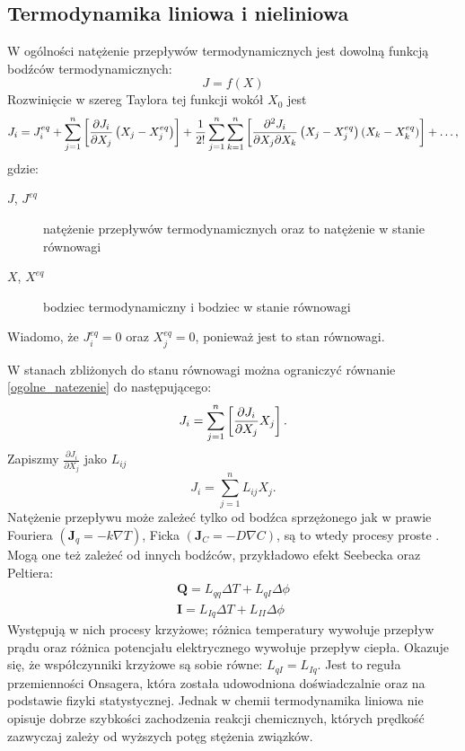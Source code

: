 \documentclass[10pt, a4paper, twoside, onecolumn]{article}
\numberwithin{equation}{section}
\begin{document}
	\subsection{Termodynamika liniowa i nieliniowa}
	W ogólności natężenie przepływów termodynamicznych jest dowolną funkcją bodźców termodynamicznych: 
	\[J=f\left(X\right)\]
	Rozwinięcie w szereg Taylora tej funkcji wokół \(X_{0}\) jest
	\begin{equation}\label{ogolne_natezenie}
		J_{i}=J_{i}^{eq}+\sum_{j=1}^{n}\left[\pdv{J_{i}}{X_{j}}\left(X_{j}-X_{j}^{eq}\right)\right]+\frac{1}{2!}\sum_{j=1}^{n}\sum_{k=1}^{n}\left[\pdv{J_{i}}{X_{j}}{X_{k}}\left(X_{j}-X_{j}^{eq}\right)\left(X_{k}-X_{k}^{eq}\right)\right]+\ldots,
	\end{equation}
	gdzie:
	\begin{description}
		\item[\(J\), \(J^{eq}\)] natężenie przepływów termodynamicznych oraz to natężenie w stanie równowagi
		\item[\(X\), \(X^{eq}\)] bodziec termodynamiczny i bodziec w stanie równowagi
	\end{description}
	Wiadomo, że \(J_{i}^{eq}=0\) oraz \(X_{j}^{eq}=0\), ponieważ jest to stan równowagi. \par
	W stanach zbliżonych do stanu równowagi można ograniczyć równanie \eqref{ogolne_natezenie} do następującego: 
	\begin{equation}\label{natezenie_liniowe}
		J_{i}=\sum_{j=1}^{n}\left[\pdv{J_{i}}{X_{j}}X_{j}\right].
	\end{equation}
	Zapiszmy \(\frac{\partial J_{i}}{\partial X_{j}}\) jako \(L_{ij}\)
	\begin{equation}
		J_{i}=\sum_{j=1}^{n}L_{ij}X_{j}.
	\end{equation}
	Natężenie przepływu może zależeć tylko od bodźca sprzężonego jak w prawie Fouriera \(\left(\boldsymbol{J}_{q}=-k\nabla T\right)\), Ficka \(\left(\boldsymbol{J}_{C}=-D\nabla C\right)\), są to wtedy procesy proste \cite{orlik}. Mogą one też zależeć od innych bodźców, przykładowo efekt Seebecka oraz Peltiera:
	\begin{gather}
		\boldsymbol{Q}=L_{qq}\Delta T+L_{qI}\Delta \phi \\
		\boldsymbol{I}=L_{Iq}\Delta T+L_{II}\Delta \phi
	\end{gather}\cite{Ceynowa2008}
	Występują w nich procesy krzyżowe; różnica temperatury wywołuje przepływ prądu oraz różnica potencjału elektrycznego wywołuje przepływ ciepła.
	Okazuje się, że współczynniki krzyżowe są sobie równe: \(L_{qI}=L_{Iq}\). Jest to reguła przemienności Onsagera, która została udowodniona doświadczalnie oraz na podstawie fizyki statystycznej. 
	Jednak w chemii termodynamika liniowa nie opisuje dobrze szybkości zachodzenia reakcji chemicznych, których prędkość zazwyczaj zależy od wyższych potęg stężenia związków. \par
	
\end{document}
